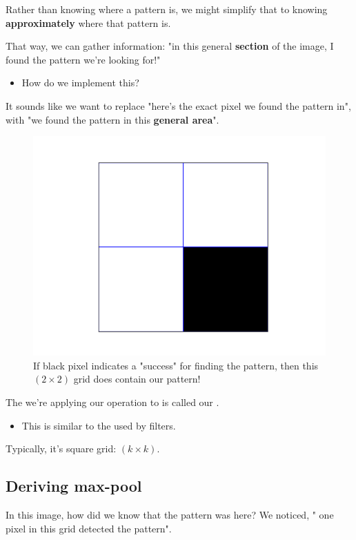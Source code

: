         Rather than knowing  where a pattern is, we might simplify that to knowing \textbf{approximately} where that pattern is.

        That way, we can gather information: "in this general \textbf{section} of the image, I found the pattern we're looking for!"

        \begin{itemize}
            \item How do we implement this?
        \end{itemize}

        It sounds like we want to replace "here's the exact pixel we found the pattern in", with "we found the pattern in this \textbf{general area}".

        \begin{figure}[H]
            \centering
            \includegraphics[width=.3\textwidth]{images/convolutional_neural_networks_images/maxpool_success.png}
            
            \caption*{If black pixel indicates a "success" for finding the pattern, then this $(2 \times 2)$ grid does contain our pattern!}
        \end{figure}

        \begin{definition}
            The  we're applying our  operation to is called our .

            \begin{itemize}
                \item This is similar to the  used by filters.
            \end{itemize}

            Typically, it's square grid: $(k \times k)$.
        \end{definition}

    \subsection{Deriving max-pool}

        In this image, how did we know that the pattern was here? We noticed, " one pixel in this grid detected the pattern".

